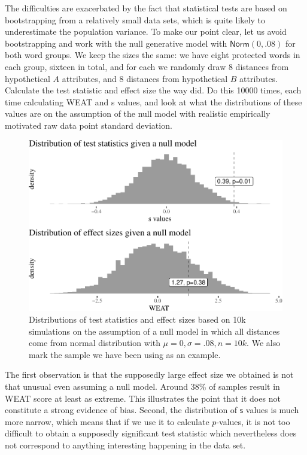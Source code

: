 \documentclass{clv3}
\begin{document}
The difficulties are exacerbated by the fact that statistical tests are
based on bootstrapping from a relatively small data sets, which is quite
likely to underestimate the population variance. To make our point
clear, let us avoid bootstrapping and work with the null generative
model with \(\mathsf{Norm}(0,.08)\) for both word groups. We keep the
sizes the same: we have eight protected words in each group, sixteen in
total, and for each we randomly draw 8 distances from hypothetical \(A\)
attributes, and \(8\) distances from hypothetical \(B\) attributes.
Calculate the test statistic and effect size the way \citep{Caliskan2017semanticsBiases} did. Do
this 10000 times, each time calculating \textsf{WEAT} and \textsf{s}
values, and look at what the distributions of these values are on the
assumption of the null model with realistic empirically motivated raw
data point standard deviation.

\begin{figure}

\begin{center}\includegraphics[width=0.8\linewidth]{figures/figourDistancesPlot2f} \end{center}

\caption{Distributions of test statistics and effect sizes based on 10k simulations on the assumption of a null model in which all distances come from normal distribution with $\mu =0, \sigma = .08, n=10k$. We also mark the sample we have been using as an example.}
\label{fig:ourDistances}
\end{figure}

The first observation is that the supposedly large effect size we
obtained is not that unusual even assuming a null model. Around 38\% of
samples result in \textsf{WEAT} score at least as extreme. This
illustrates the point that it does not constitute a strong evidence of
bias. Second, the distribution of \(\textsf{s}\) values is much more
narrow, which means that if we use it to calculate \(p\)-values, it is
not too difficult to obtain a supposedly significant test statistic
which nevertheless does not correspond to anything interesting happening
in the data set.
\end{document}

